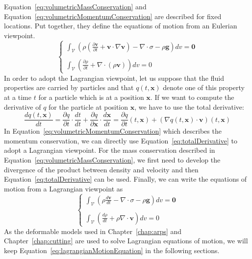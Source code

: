 Equation~\eqref{eq:volumetricMassConservation} and Equation~\eqref{eq:volumetricMomentumConservation} are described for fixed locations. Put together, they define the equations of motion from an Eulerian viewpoint.
\begin{equation}
\label{eq:eulerianMotionEquation}
\left\lbrace
\begin{array}{l}
\displaystyle 
\int_{\mathcal{V}} 
\left( 
\rho \left( \frac{\partial\mathbf{v}}{\partial t} + \mathbf{v} \cdot \nabla \mathbf{v} \right)
- \nabla \cdot \sigma - \rho \mathbf{g}  \right) dv = \mathbf{0}
\\ \\
\displaystyle
\int_{\mathcal{V}} 
\left( \frac{\partial \rho}{\partial t} + \nabla \cdot \left( \rho  \mathbf{v} \right) \right) dv = 0
\end{array}
\right.
\end{equation}
In order to adopt the Lagrangian viewpoint, let us suppose that the fluid properties are carried by particles and that $q(t,\mathbf{x})$ denote one of this property at a time $t$ for a particle which is at a position $\mathbf{x}$. 
If we want to compute the derivative of $q$ for the particle at position $\mathbf{x}$, we have to use the total derivative:
\begin{equation}
\label{eq:totalDerivative}
\frac{dq(t,\mathbf{x})}{dt} = 
\frac{\partial q}{\partial t}\cdot\frac{dt}{dt} + \frac{\partial q}{\partial \mathbf{x}} \cdot \frac{d\mathbf{x}}{dt} 
= \frac{\partial q}{\partial t}(t,\mathbf{x}) + \left(\nabla q(t,\mathbf{x}) \cdot \mathbf{v}\right)(t,\mathbf{x})
\end{equation}
In Equation~\eqref{eq:volumetricMomentumConservation} which describes the momentum conservation, we can directly use Equation~\eqref{eq:totalDerivative} to adopt a Lagrangian viewpoint. 
For the mass conservation described in Equation~\eqref{eq:volumetricMassConservation}, we first need to develop the divergence of the product between density and velocity and then Equation~\eqref{eq:totalDerivative} can be used.
Finally, we can write the equations of motion from a Lagrangian viewpoint as
\begin{equation}
\label{eq:lagrangianMotionEquation}
\left\lbrace
\begin{array}{l}
\displaystyle 
\int_{\mathcal{V}} 
\left( 
\rho \frac{d\mathbf{v}}{dt}
- \nabla \cdot \sigma - \rho \mathbf{g}  \right) dv = \mathbf{0}
\\ \\
\displaystyle
\int_{\mathcal{V}} 
\left( \frac{d\rho}{dt} + \rho \nabla \cdot \mathbf{v} \right) dv = 0
\end{array}
\right.
\end{equation}
As the deformable models used in Chapter~\ref{chap:arps} and Chapter~\ref{chap:cutting} are used to solve Lagrangian equations of motion, we will keep Equation~\eqref{eq:lagrangianMotionEquation} in the following sections.

